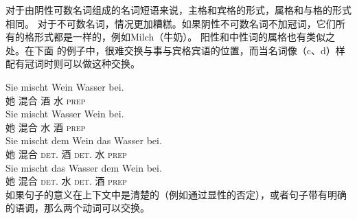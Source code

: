 对于由阴性可数名词组成的名词短语来说，主格和宾格的形式，属格和与格的形式相同。
对于不可数名词，情况更加糟糕。如果阴性不可数名词不加冠词，它们所有的格形式都是一样的，例如Milch（牛奶）。
阳性和中性词的属格也有类似之处。在下面 \citet[]{Wegener85b}的例子中，很难交换与事与宾格宾语的位置，而当名词像（c、d）样配有冠词时则可以做这种交换。

\eal
\ex 
\gll Sie mischt Wein Wasser bei.\\
     她 混合 酒 水 \textsc{prep} \\
\ex 
\gll Sie mischt Wasser Wein bei.\\
     她 混合 水 酒 \textsc{prep} \\
\ex 
\gll Sie mischt dem Wein das Wasser bei.\\
     她 混合 \textsc{det}.\dat{} 酒 \textsc{det}.\acc{} 水 \textsc{prep} \\ 
\ex 
\gll Sie mischt das Wasser dem Wein bei.\\
     她 混合 \textsc{det}.\acc{} 水 \textsc{det}.\dat{} 酒 \textsc{prep} \\ 
\zl
如果句子的意义在上下文中是清楚的（例如通过显性的否定），或者句子带有明确的语调，那么两个动词可以交换。

